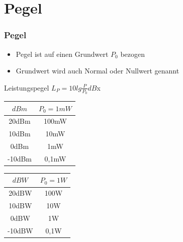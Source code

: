 \section{Pegel}

\begin{frame}
    \frametitle{Pegel}

    \begin{itemize}
        \item Pegel ist auf einen Grundwert $P_0$ bezogen
        \item Grundwert wird auch Normal oder Nullwert genannt
    \end{itemize}

    \begin{block}{Leistungspegel}
        \centering \Large $L_P = 10 lg \frac{P}{P_0} dB$\alert{x}
    \end{block}

\begin{center}
\begin{minipage}{0.3\textwidth}
	\begin{tabular}{|c|c|}
		\hline
		$dBm$ & $P_0 = 1 mW$ \\
		\hline \hline
		20dBm  & 100mW  \\ \hline
		10dBm  & 10mW   \\ \hline
		0dBm   & 1mW    \\ \hline
		-10dBm & 0,1mW  \\ \hline
	\end{tabular}
\end{minipage}
\hspace{2cm}
\begin{minipage}{0.3\textwidth}
	\begin{tabular}{|c|c|}
		\hline
		$dBW$ & $P_0 = 1 W$ \\
		\hline \hline
		20dBW  & 100W  \\ \hline
		10dBW  & 10W   \\ \hline
		0dBW   & 1W    \\ \hline
		-10dBW & 0,1W  \\ \hline
	\end{tabular}
\end{minipage}
\vspace{0.5cm}
\end{center}
\end{frame}



